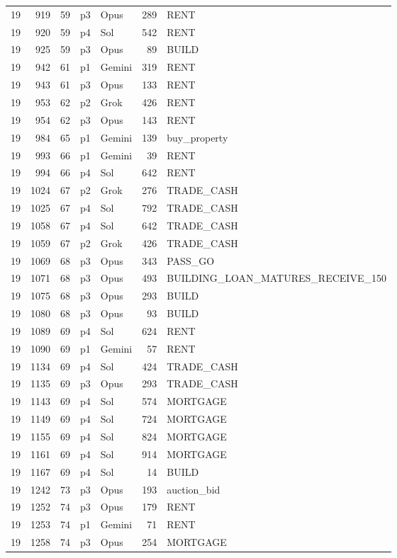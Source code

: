 \begin{longtable}{r r r l l r >{\ttfamily}l}
19 & 919 & 59 & p3 & Opus & 289 & RENT \\
19 & 920 & 59 & p4 & Sol & 542 & RENT \\
19 & 925 & 59 & p3 & Opus & 89 & BUILD \\
19 & 942 & 61 & p1 & Gemini & 319 & RENT \\
19 & 943 & 61 & p3 & Opus & 133 & RENT \\
19 & 953 & 62 & p2 & Grok & 426 & RENT \\
19 & 954 & 62 & p3 & Opus & 143 & RENT \\
19 & 984 & 65 & p1 & Gemini & 139 & buy\_property \\
19 & 993 & 66 & p1 & Gemini & 39 & RENT \\
19 & 994 & 66 & p4 & Sol & 642 & RENT \\
19 & 1024 & 67 & p2 & Grok & 276 & TRADE\_CASH \\
19 & 1025 & 67 & p4 & Sol & 792 & TRADE\_CASH \\
19 & 1058 & 67 & p4 & Sol & 642 & TRADE\_CASH \\
19 & 1059 & 67 & p2 & Grok & 426 & TRADE\_CASH \\
19 & 1069 & 68 & p3 & Opus & 343 & PASS\_GO \\
19 & 1071 & 68 & p3 & Opus & 493 & BUILDING\_LOAN\_MATURES\_RECEIVE\_150 \\
19 & 1075 & 68 & p3 & Opus & 293 & BUILD \\
19 & 1080 & 68 & p3 & Opus & 93 & BUILD \\
19 & 1089 & 69 & p4 & Sol & 624 & RENT \\
19 & 1090 & 69 & p1 & Gemini & 57 & RENT \\
19 & 1134 & 69 & p4 & Sol & 424 & TRADE\_CASH \\
19 & 1135 & 69 & p3 & Opus & 293 & TRADE\_CASH \\
19 & 1143 & 69 & p4 & Sol & 574 & MORTGAGE \\
19 & 1149 & 69 & p4 & Sol & 724 & MORTGAGE \\
19 & 1155 & 69 & p4 & Sol & 824 & MORTGAGE \\
19 & 1161 & 69 & p4 & Sol & 914 & MORTGAGE \\
19 & 1167 & 69 & p4 & Sol & 14 & BUILD \\
19 & 1242 & 73 & p3 & Opus & 193 & auction\_bid \\
19 & 1252 & 74 & p3 & Opus & 179 & RENT \\
19 & 1253 & 74 & p1 & Gemini & 71 & RENT \\
19 & 1258 & 74 & p3 & Opus & 254 & MORTGAGE \\

\end{longtable}
